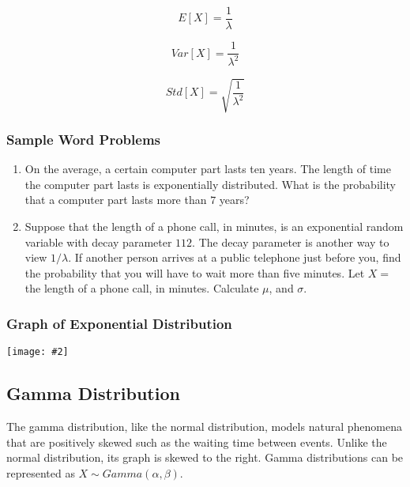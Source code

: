 \documentclass[a4paper]{article}
\newcommand*{\newincludegraphics}[2][]{
    \begin{center}
        \begin{adjustbox}{max size={\textwidth}{\textheight}}
            \texttt{[image: \#2]}
        \end{adjustbox}
    \end{center}
}
\begin{document}
    \begin{equation}
        \label{eq:exponential_mean}
        E[X] = \frac{1}{\lambda}
        \end{equation}

    \begin{equation}
        \label{eq:exponential_variance}
        Var[X] = \frac{1}{\lambda^2}
    \end{equation}

    \begin{equation}
        \label{eq:exponential_std}
        Std[X] = \sqrt{\frac{1}{\lambda^2}}
    \end{equation}

    \subsubsection*{Sample Word Problems}
    \begin{enumerate}
        \item On the average, a certain computer part lasts ten years. The length of time the computer part lasts is exponentially distributed. What is the probability that a computer part lasts more than $7$ years?
        \item Suppose that the length of a phone call, in minutes, is an exponential random variable with decay parameter $112$. The decay parameter is another way to view $1/\lambda$. If another person arrives at a public telephone just before you, find the probability that you will have to wait more than five minutes. Let $X =$ the length of a phone call, in minutes. Calculate $\mu$, and $\sigma$.
    \end{enumerate}

    \subsubsection*{Graph of Exponential Distribution}
    \newincludegraphics[]{(C)-Exponential_distribution_visualization.png}

    \subsection{Gamma Distribution}
    The gamma distribution, like the normal distribution, models natural phenomena that are positively skewed such as the waiting time between events. Unlike the normal distribution, its graph is skewed to the right. Gamma distributions can be represented as $X \sim Gamma(\alpha, \beta)$.
\end{document}
